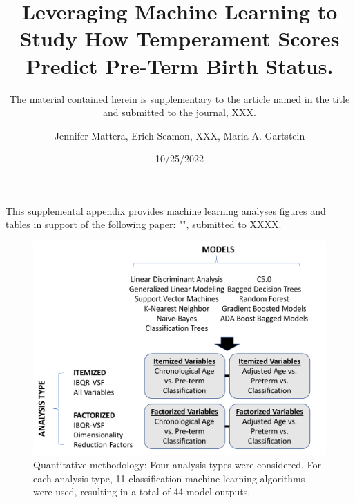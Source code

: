 \documentclass[
]{article}
\title{Leveraging Machine Learning to Study How Temperament Scores
Predict Pre-Term Birth Status.}
\subtitle{The material contained herein is supplementary to the article
named in the title and submitted to the journal, XXX.}
\author{Jennifer Mattera, Erich Seamon, XXX, Maria A. Gartstein}
\date{10/25/2022}
\begin{document}
\maketitle

This supplemental appendix provides machine learning analyses figures
and tables in support of the following paper: "", submitted to XXXX.

\newpage

\listoffigures
\listoftables
\newpage

\newpage

\begin{figure}[H]

{\centering \includegraphics[width=0.75\linewidth]{./images/Figure1} 

}

\caption{Quantitative methodology:  Four analysis types were considered. For each analysis type, 11 classification machine learning algorithms were used, resulting in a total of 44 model outputs.}\label{fig:image-ref-for-in-text}
\end{figure}
\newpage

\hypertarget{section}{%
\section{}\label{section}}
\end{document}
